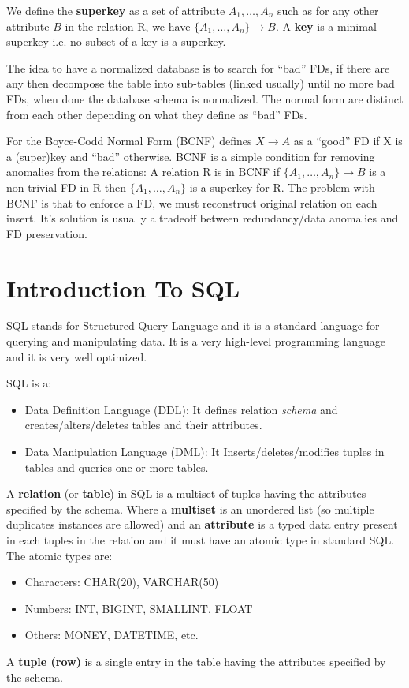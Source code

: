 \documentclass[a4page, 11pt]{article}
\begin{document}
We define the \textbf{superkey} as a set of attribute $A_1,\hdots, A_n$ such as for any other attribute $B$ in the relation R, we have $\{A_1,\hdots,A_n\} \rightarrow B$. 
A \textbf{key} is a minimal superkey i.e. no subset of a key is a superkey.

The idea to have a normalized database is to search for ``bad'' FDs, if there are any then decompose the table into sub-tables (linked usually) until no more bad FDs, when done the database schema is normalized. 
The normal form are distinct from each other depending on what they define as ``bad'' FDs.

For the Boyce-Codd Normal Form (BCNF) defines $X \rightarrow A$ as a ``good'' FD if X is a (super)key and ``bad'' otherwise. 
BCNF is a simple condition for removing anomalies from the relations: A relation R is in BCNF if $\{A_1,\hdots,A_n\} \rightarrow B$ is a non-trivial FD in R then $\{A_1,\hdots,A_n\}$ is a superkey for R.\newline
The problem with BCNF is that to enforce a FD, we must reconstruct original relation on each insert. It's solution is usually a tradeoff between redundancy/data anomalies and FD preservation.

\section{Introduction To SQL}
SQL stands for Structured Query Language and it is a standard language for querying and manipulating data. It is a very high-level programming language and it is very well optimized.


SQL is a:
\begin{itemize}[noitemsep]
	\item Data Definition Language (DDL):\newline
	 It defines relation \textit{schema} and creates/alters/deletes tables and their attributes.
	\item Data Manipulation Language (DML):\newline
	It Inserts/deletes/modifies tuples in tables and queries one or more tables.
\end{itemize}

A \textbf{relation} (or \textbf{table}) in SQL is a multiset of tuples having the attributes specified by the schema. Where a \textbf{multiset} is an unordered list (so multiple duplicates instances are allowed) and an \textbf{attribute} is a typed data entry present in each tuples in the relation and it must have an atomic type in standard SQL. The atomic types are:
\begin{itemize}[noitemsep]
	\item Characters: CHAR(20), VARCHAR(50)
	\item Numbers: INT, BIGINT, SMALLINT, FLOAT
	\item Others: MONEY, DATETIME, etc.
\end{itemize}
A \textbf{tuple (row)} is a single entry in the table having the attributes specified by the schema.
\end{document}
